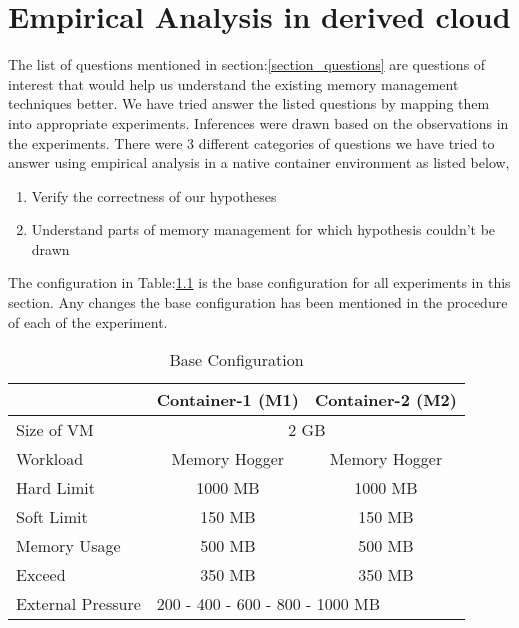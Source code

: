 
\chapter{Empirical Analysis in derived cloud}

  The list of questions mentioned in section:\ref{section_questions} are questions of interest that would help us understand the existing 
memory management techniques better. We have tried answer the listed questions by mapping them into appropriate experiments. Inferences 
were drawn based on the observations in the experiments. There were 3 different categories of questions we have tried to answer using 
empirical analysis in a native container environment as listed below,
  
  \begin{enumerate}
    \item Verify the correctness of our hypotheses
    \item Understand parts of memory management for which hypothesis couldn't be drawn
  \end{enumerate}
  
  The configuration in Table:\ref{table_native_base} is the base configuration for all experiments in this section. Any changes the base 
configuration has been mentioned in the procedure of each of the experiment.

    \begin{table}	 
      \begin{center}
	\begin{tabular}{ l | c | c }
	  & Container-1 (M1) & Container-2 (M2) \\ 
	  \hline
	  \hline
	  Size of VM & \multicolumn{2}{c}{2 GB} \\	      
	  \hline
	  Workload & Memory Hogger & Memory Hogger \\
	  \hline
	  Hard Limit & 1000 MB & 1000 MB \\  
	  \hline
	  Soft Limit & 150 MB & 150 MB \\  
	  \hline
	  Memory Usage & 500 MB & 500 MB \\
	  \hline
	  Exceed & 350 MB & 350 MB \\
	  \hline 
	  External Pressure & \multicolumn{2}{l}{ 200 - 400 - 600 - 800 - 1000 MB} \\
	\end{tabular}	    
	\caption{Base Configuration}
	\label{table_native_base}
      \end{center}
    \end{table}
    
